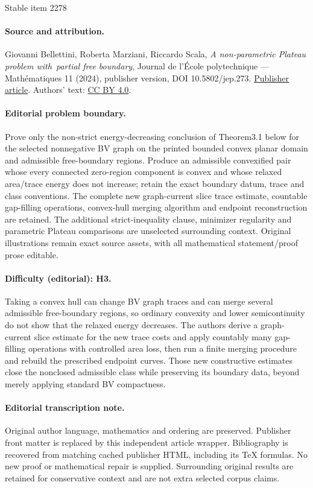 \documentclass[11pt]{article}
\numberwithin{equation}{section}
\theoremstyle{definition}
\begin{document}
\begin{center}{\Large Stable item 2278}\end{center}
\paragraph{Source and attribution.}
Giovanni Bellettini, Roberta Marziani, Riccardo Scala, \emph{A non-parametric Plateau problem with partial free boundary}, Journal de l’École polytechnique — Mathématiques 11 (2024), publisher version, DOI 10.5802/jep.273. \href{https://jep.centre-mersenne.org/articles/10.5802/jep.273/}{Publisher article}. Authors' text: \href{https://creativecommons.org/licenses/by/4.0/}{CC BY 4.0}.
\paragraph{Editorial problem boundary.}
Prove only the non-strict energy-decreasing conclusion of Theorem3.1 below for the selected nonnegative BV graph on the printed bounded convex planar domain and admissible free-boundary regions. Produce an admissible convexified pair whose every connected zero-region component is convex and whose relaxed area/trace energy does not increase; retain the exact boundary datum, trace and class conventions. The complete new graph-current slice trace estimate, countable gap-filling operations, convex-hull merging algorithm and endpoint reconstruction are retained. The additional strict-inequality clause, minimizer regularity and parametric Plateau comparisons are unselected surrounding context. Original illustrations remain exact source assets, with all mathematical statement/proof prose editable.
\paragraph{Difficulty (editorial): H3.}
Taking a convex hull can change BV graph traces and can merge several admissible free-boundary regions, so ordinary convexity and lower semicontinuity do not show that the relaxed energy decreases. The authors derive a graph-current slice estimate for the new trace costs and apply countably many gap-filling operations with controlled area loss, then run a finite merging procedure and rebuild the prescribed endpoint curves. Those new constructive estimates close the nonclosed admissible class while preserving its boundary data, beyond merely applying standard BV compactness.
\paragraph{Editorial transcription note.}
Original author language, mathematics and ordering are preserved. Publisher front matter is replaced by this independent article wrapper. Bibliography is recovered from matching cached publisher HTML, including its TeX formulas. No new proof or mathematical repair is supplied. Surrounding original results are retained for conservative context and are not extra selected corpus claims.
\clearpage
\end{document}
